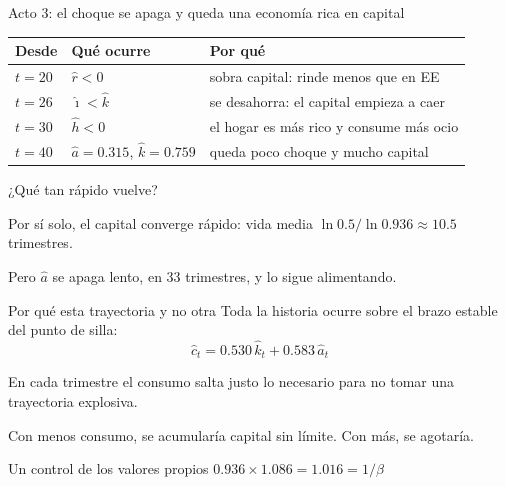 \begin{frame}[label=acto3]{Acto 3: el choque se apaga y queda una economía rica en capital}
  \centering\small\setlength{\tabcolsep}{4pt}
  \renewcommand{\arraystretch}{1.3}
  \begin{tabular}{@{}lll@{}}
    \toprule
    \textbf{Desde} & \textbf{Qué ocurre} & \textbf{Por qué}\\
    \midrule
    $t=20$ & $\hat r<0$ & sobra capital: rinde menos que en EE\\
    $t=26$ & $\hat\imath<\hat k$ & se desahorra: el capital empieza a caer\\
    $t=30$ & $\hat h<0$ & el hogar es más rico y consume más ocio\\
    $t=40$ & $\hat a=0.315$, $\hat k=0.759$ & queda poco choque y mucho capital\\
    \bottomrule
  \end{tabular}
  \par\vspace{0.4cm}\raggedright\normalsize
  ¿Qué tan rápido vuelve?\par
  \vspace{0.15cm}
  Por sí solo, el capital converge rápido: vida media $\ln0.5/\ln0.936\approx10.5$
  trimestres.\par
  \vspace{0.15cm}
  Pero $\hat a$ se apaga lento, en 33 trimestres, y lo sigue alimentando.
\end{frame}

\begin{frame}[label=silla]{Por qué esta trayectoria y no otra}
  Toda la historia ocurre sobre el brazo estable del punto de silla:
  \[
  \hat c_t=0.530\,\hat k_t+0.583\,\hat a_t
  \]
  \par\vspace{0.1cm}
  En cada trimestre el consumo salta justo lo necesario para no tomar una
  trayectoria explosiva.\par
  \vspace{0.2cm}
  Con menos consumo, se acumularía capital sin límite. Con más, se agotaría.\par
  \vspace{0.4cm}
  \begin{block}{Un control de los valores propios}
    $0.936\times1.086=1.016=1/\beta$
  \end{block}
\end{frame}

